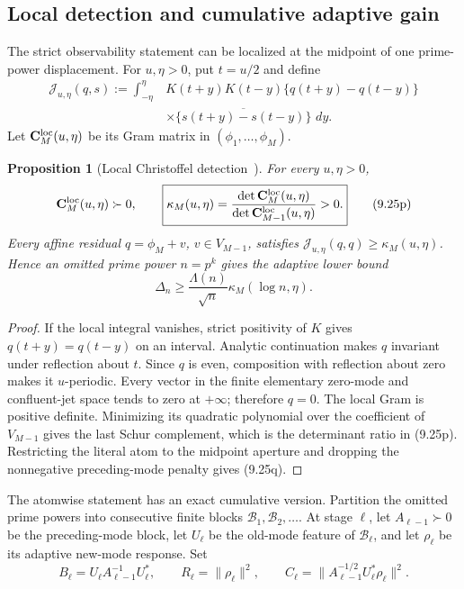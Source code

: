 \documentclass[11pt]{amsart}
\newtheorem{proposition}[theorem]{Proposition}
\theoremstyle{definition}
\theoremstyle{remark}
\newcommand{\dd}{\,d}
\begin{document}
\subsection{Local detection and cumulative adaptive gain}

The strict observability statement can be localized at the midpoint of
one prime-power displacement.  For \(u,\eta>0\), put \(t=u/2\) and
define
\[
\begin{aligned}
 \mathcal J_{u,\eta}(q,s)
 :=\int_{-\eta}^{\eta}&K(t+y)K(t-y)
 \{q(t+y)-q(t-y)\}\\
 &\times\overline{\{s(t+y)-s(t-y)\}}\,\dd y .
\end{aligned}
\tag{9.25o}
\]
Let \(\mathbf C_M^{\rm loc}(u,\eta)\) be its Gram matrix in
\((\phi_1,\ldots,\phi_M)\).

\begin{proposition}[Local Christoffel detection~\cite{Karlin1968,Ismail2005}]
\label{prop:local-christoffel}
For every \(u,\eta>0\),
\[
 \mathbf C_M^{\rm loc}(u,\eta)\succ0,
 \qquad
 \boxed{\kappa_M(u,\eta)
 =\frac{\det\mathbf C_M^{\rm loc}(u,\eta)}
        {\det\mathbf C_{M-1}^{\rm loc}(u,\eta)}>0.}
\tag{9.25p}
\]
Every affine residual \(q=\phi_M+v\), \(v\in V_{M-1}\), satisfies
\(\mathcal J_{u,\eta}(q,q)\ge\kappa_M(u,\eta)\).  Hence an omitted
prime power \(n=p^k\) gives the adaptive lower bound
\[
 \Delta_n\ge\frac{\Lambda(n)}{\sqrt n}
 \kappa_M(\log n,\eta).
\tag{9.25q}
\]
\end{proposition}

\begin{proof}
If the local integral vanishes, strict positivity of \(K\) gives
\(q(t+y)=q(t-y)\) on an interval.  Analytic continuation makes \(q\)
invariant under reflection about \(t\).  Since \(q\) is even, composition
with reflection about zero makes it \(u\)-periodic.  Every vector in the
finite elementary zero-mode and confluent-jet space tends to zero at
\(+\infty\); therefore \(q=0\).  The local Gram is positive definite.
Minimizing its quadratic polynomial over the coefficient of
\(V_{M-1}\) gives the last Schur complement, which is the determinant
ratio in (9.25p).  Restricting the literal atom to the midpoint aperture
and dropping the nonnegative preceding-mode penalty gives (9.25q).
\end{proof}

The atomwise statement has an exact cumulative version.  Partition the
omitted prime powers into consecutive finite blocks
\(\mathcal B_1,\mathcal B_2,\ldots\).  At stage \(\ell\), let
\(A_{\ell-1}\succ0\) be the preceding-mode block, let \(U_\ell\) be the
old-mode feature of \(\mathcal B_\ell\), and let \(\rho_\ell\) be its
adaptive new-mode response.  Set
\[
 B_\ell=U_\ell A_{\ell-1}^{-1}U_\ell^*,\qquad
 R_\ell=\|\rho_\ell\|^2,
 \qquad
 C_\ell=\|A_{\ell-1}^{-1/2}U_\ell^*\rho_\ell\|^2.
\tag{9.25r}
\]
\end{document}
